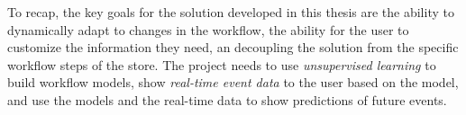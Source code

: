 
To recap, the key goals for the solution developed in this thesis are the ability to dynamically adapt to changes in the workflow,
the ability for the user to customize the information they need, an decoupling the solution from the specific 
workflow steps of the store. 
The project needs to use \emph{unsupervised learning} to build workflow models, show \emph{real-time event data} to the user based on the model, 
and use the models and the real-time data to show predictions of future events.
